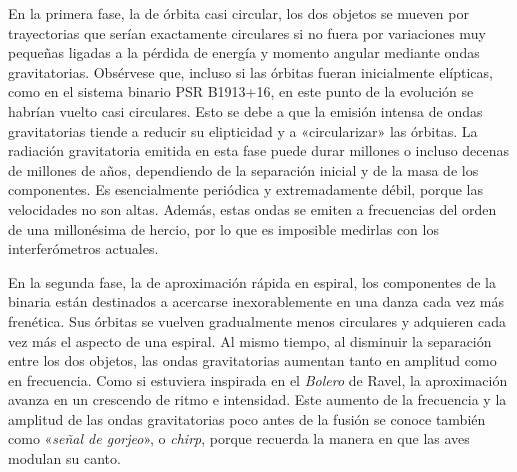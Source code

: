 En la primera fase, la de órbita casi circular, los dos objetos se mueven por trayectorias que serían exactamente circulares si no fuera por variaciones muy pequeñas ligadas a la pérdida de energía y momento angular mediante ondas gravitatorias. Obsérvese que, incluso si las órbitas fueran inicialmente elípticas, como en el sistema binario PSR B1913+16, en este punto de la evolución se habrían vuelto casi circulares. Esto se debe a que la emisión intensa de ondas gravitatorias tiende a reducir su elipticidad y a «circularizar» las órbitas. La radiación gravitatoria emitida en esta fase puede durar millones o incluso decenas de millones de años, dependiendo de la separación inicial y de la masa de los componentes. Es esencialmente periódica y extremadamente débil, porque las velocidades no son altas. Además, estas ondas se emiten a frecuencias del orden de una millonésima de hercio, por lo que es imposible medirlas con los interferómetros actuales.

En la segunda fase, la de aproximación rápida en espiral, los componentes de la binaria están destinados a acercarse inexorablemente en una danza cada vez más frenética. Sus órbitas se vuelven gradualmente menos circulares y adquieren cada vez más el aspecto de una espiral. Al mismo tiempo, al disminuir la separación entre los dos objetos, las ondas gravitatorias aumentan tanto en amplitud como en frecuencia. Como si estuviera inspirada en el \emph{Bolero} de Ravel, la aproximación avanza en un crescendo de ritmo e intensidad. Este aumento de la frecuencia y la amplitud de las ondas gravitatorias poco antes de la fusión se conoce también como «\emph{señal de gorjeo}», o \emph{chirp}, porque recuerda la manera en que las aves modulan su canto.

